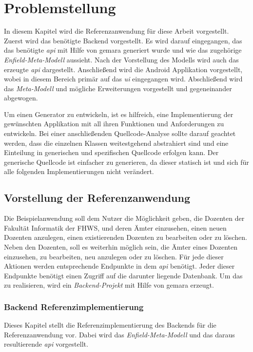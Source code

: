 \chapter{Problemstellung} \label{ch:problem}
In diesem Kapitel wird die Referenzanwendung für diese Arbeit vorgestellt. Zuerst wird das benötigte Backend vorgestellt. Es wird darauf eingegangen, das das benötigte \textit{\acf{api}} mit Hilfe von \acf{gemara} generiert wurde und wie das zugehörige \textit{Enfield-Meta-Modell} aussieht. Nach der Vorstellung des Modells wird auch das erzeugte \textit{\acf{api}} dargestellt. Anschließend wird die Android Applikation vorgestellt, wobei in diesem Bereich primär auf das \textit{\acf{ui}} eingegangen wird. Abschließend wird das \textit{Meta-Modell} und mögliche Erweiterungen vorgestellt und gegeneinander abgewogen.

Um einen Generator zu entwickeln, ist es hilfreich, eine Implementierung der gewünschten Applikation mit all ihren Funktionen und Anforderungen zu entwickeln. Bei einer anschließenden Quellcode-Analyse sollte darauf geachtet werden, dass die einzelnen Klassen weitestgehend abstrahiert sind und eine Einteilung in generischen und spezifischen Quellcode erfolgen kann. Der generische Quellcode ist einfacher zu generieren, da dieser statisch ist und sich für alle folgenden Implementierungen nicht verändert. 

\section{Vorstellung der Referenzanwendung}
Die Beispielanwendung soll dem Nutzer die Möglichkeit geben, die Dozenten der Fakultät Informatik der FHWS, und deren Ämter einzusehen, einen neuen Dozenten anzulegen, einen existierenden Dozenten zu bearbeiten oder zu löschen. Neben den Dozenten, soll es weiterhin möglich sein, die Ämter eines Dozenten einzusehen, zu bearbeiten, neu anzulegen oder zu löschen. Für jede dieser Aktionen werden entsprechende Endpunkte in dem \textit{\acf{api}} benötigt. Jeder dieser Endpunkte benötigt einen Zugriff auf die darunter liegende Datenbank. Um das zu realisieren, wird ein \textit{Backend-Projekt} mit Hilfe von \ac{gemara} erzeugt.

\subsection{Backend Referenzimplementierung}
Dieses Kapitel stellt die Referenzimplementierung des Backends für die Referenzanwendung vor. Dabei wird das \textit{Enfield-Meta-Modell} und das daraus resultierende \textit{\acf{api}} vorgestellt.

